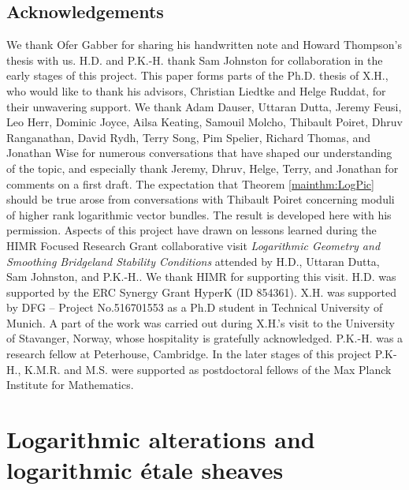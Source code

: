 \documentclass[11pt]{amsart}
\newcommand{\PKHcomment}[1]{{\color{red}PKH: #1}}
\theoremstyle{definition}
\theoremstyle{definition}
\begin{document}
\subsection*{Acknowledgements} %
We thank Ofer Gabber for sharing his handwritten note \cite{GabberToricFlattening} and Howard Thompson's thesis \cite{on-toric-log-schemes} with us. H.D. and P.K.-H. thank Sam Johnston for collaboration in the early stages of this project. This paper forms parts of the Ph.D. thesis of X.H., who would like to thank his advisors, Christian Liedtke and Helge Ruddat, for their unwavering support.
We thank Adam Dauser, Uttaran Dutta, Jeremy Feusi, Leo Herr, Dominic Joyce, Ailsa Keating, Samouil Molcho, Thibault Poiret, Dhruv Ranganathan, David Rydh, Terry Song, Pim Spelier, Richard Thomas, and Jonathan Wise %
for numerous conversations that have shaped our understanding of the topic, and especially thank Jeremy, Dhruv, Helge, Terry, and Jonathan for comments on a first draft.
The expectation that Theorem \ref{mainthm:LogPic} should be true arose from conversations with Thibault Poiret concerning moduli of higher rank logarithmic vector bundles. The result is developed here with his permission. 
Aspects of this project have drawn on lessons learned during the HIMR Focused Research Grant collaborative visit \textit{Logarithmic Geometry and Smoothing Bridgeland Stability Conditions} attended by H.D., Uttaran Dutta, Sam Johnston, and P.K.-H.. We thank HIMR for supporting this visit. H.D.  was supported by the ERC Synergy Grant HyperK (ID 854361). X.H. was supported by DFG -- Project No.516701553 as a Ph.D student in Technical University of Munich. A part of the work was carried out during X.H.'s visit to the University of Stavanger, Norway, whose hospitality is gratefully acknowledged.
P.K.-H. was a research fellow at Peterhouse, Cambridge. In the later stages of this project P.K-H., K.M.R. and M.S. were supported as postdoctoral fellows of the Max Planck Institute for Mathematics. 
\section{Logarithmic alterations and logarithmic \'etale sheaves}\label{section-on-log-etale-topoi}
\end{document}
